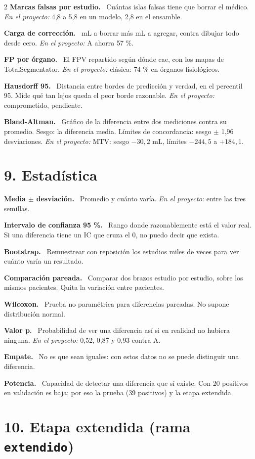 \documentclass[9pt,a4paper]{extarticle}
\newcommand{\T}[1]{{\sffamily\bfseries\color{tinta}#1.}\ }
\newcommand{\aqui}[1]{{\color{acento}\itshape En el proyecto:} #1}
\begin{document}
\begin{multicols}{2}
\T{Marcas falsas por estudio} Cuántas islas falsas tiene que borrar el médico. \aqui{4,8 a 5,8 en un modelo, 2,8 en el ensamble.}

\T{Carga de corrección} mL a borrar más mL a agregar, contra dibujar todo desde cero. \aqui{A ahorra 57 \%.}

\T{FP por órgano} El FPV repartido según dónde cae, con los mapas de TotalSegmentator. \aqui{clásica: 74 \% en órganos fisiológicos.}

\T{Hausdorff 95} Distancia entre bordes de predicción y verdad, en el percentil 95. Mide qué tan lejos queda el peor borde razonable. \aqui{comprometido, pendiente.}

\T{Bland-Altman} Gráfico de la diferencia entre dos mediciones contra su promedio. Sesgo: la diferencia media. Límites de concordancia: sesgo $\pm$ 1,96 desviaciones. \aqui{MTV: sesgo $-30{,}2$ mL, límites $-244{,}5$ a $+184{,}1$.}

\section{9. Estadística}

\T{Media $\pm$ desviación} Promedio y cuánto varía. \aqui{entre las tres semillas.}

\T{Intervalo de confianza 95 \%} Rango donde razonablemente está el valor real. Si una diferencia tiene un IC que cruza el 0, no puedo decir que exista.

\T{Bootstrap} Remuestrear con reposición los estudios miles de veces para ver cuánto varía un resultado.

\T{Comparación pareada} Comparar dos brazos estudio por estudio, sobre los mismos pacientes. Quita la variación entre pacientes.

\T{Wilcoxon} Prueba no paramétrica para diferencias pareadas. No supone distribución normal.

\T{Valor p} Probabilidad de ver una diferencia así si en realidad no hubiera ninguna. \aqui{0,52, 0,87 y 0,93 contra A.}

\T{Empate} No es que sean iguales: con estos datos no se puede distinguir una diferencia.

\T{Potencia} Capacidad de detectar una diferencia que sí existe. Con 20 positivos en validación es baja; por eso la prueba (39 positivos) y la etapa extendida.

\section{10. Etapa extendida (rama \texttt{extendido})}


\end{multicols}
\end{document}
